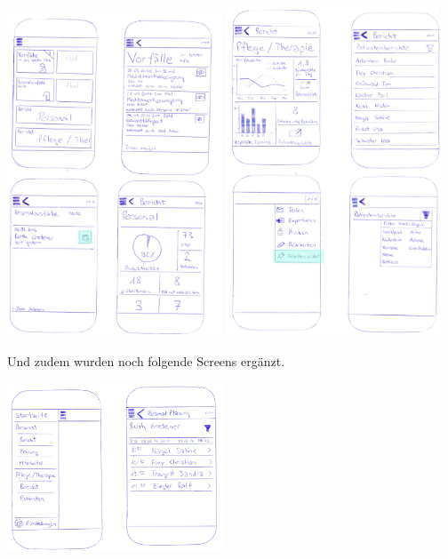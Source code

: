\documentclass[a4paper]{scrreprt}
\begin{document}
\includegraphics[width=0.48\textwidth]{storyboards_personas_prototypes/iteration3/sprim5+eller1_prototyp3_1.png}
\includegraphics[width=0.48\textwidth]{storyboards_personas_prototypes/iteration3/sprim5+eller1_prototyp3_2.png}

\bigskip

Und zudem wurden noch folgende Screens ergänzt.

\includegraphics[width=0.48\textwidth]{storyboards_personas_prototypes/iteration3/sprim5+eller1_prototyp3_3.png}
\end{document}
